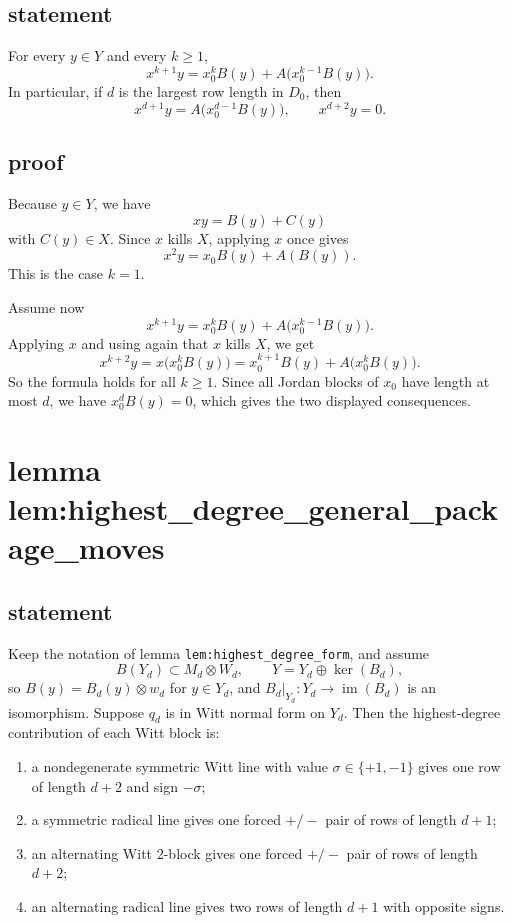 \documentclass[
]{article}
\providecommand{\tightlist}{%
  \setlength{\itemsep}{0pt}\setlength{\parskip}{0pt}}
\begin{document}
\subsection{statement}\label{statement-13}

For every \(y\in Y\) and every \(k\ge 1\), \[
x^{k+1}y=x_0^kB(y)+A\!\bigl(x_0^{k-1}B(y)\bigr).
\] In particular, if \(d\) is the largest row length in \(D_0\), then \[
x^{d+1}y=A\!\bigl(x_0^{d-1}B(y)\bigr),\qquad x^{d+2}y=0.
\]

\subsection{proof}\label{proof-13}

Because \(y\in Y\), we have \[
xy=B(y)+C(y)
\] with \(C(y)\in X\). Since \(x\) kills \(X\), applying \(x\) once
gives \[
x^2y=x_0B(y)+A(B(y)).
\] This is the case \(k=1\).

Assume now \[
x^{k+1}y=x_0^kB(y)+A\!\bigl(x_0^{k-1}B(y)\bigr).
\] Applying \(x\) and using again that \(x\) kills \(X\), we get \[
x^{k+2}y
=x\!\bigl(x_0^kB(y)\bigr)
=x_0^{k+1}B(y)+A\!\bigl(x_0^kB(y)\bigr).
\] So the formula holds for all \(k\ge 1\). Since all Jordan blocks of
\(x_0\) have length at most \(d\), we have \(x_0^dB(y)=0\), which gives
the two displayed consequences.

\section{lemma
lem:highest\_degree\_general\_package\_moves}\label{lemma-lemhighest_degree_general_package_moves}

\subsection{statement}\label{statement-14}

Keep the notation of lemma \texttt{lem:highest\_degree\_form}, and
assume \[
B(Y_d)\subset M_d\otimes W_d,
\qquad
Y=Y_d\oplus \ker(B_d),
\] so \(B(y)=B_d(y)\otimes w_d\) for \(y\in Y_d\), and
\(B_d|_{Y_d}:Y_d\to \operatorname{im}(B_d)\) is an isomorphism. Suppose
\(q_d\) is in Witt normal form on \(Y_d\). Then the highest-degree
contribution of each Witt block is:

\begin{enumerate}
\def\labelenumi{\arabic{enumi}.}
\tightlist
\item
  a nondegenerate symmetric Witt line with value \(\sigma\in\{+1,-1\}\)
  gives one row of length \(d+2\) and sign \(-\sigma\);
\item
  a symmetric radical line gives one forced \(+/-\) pair of rows of
  length \(d+1\);
\item
  an alternating Witt \(2\)-block gives one forced \(+/-\) pair of rows
  of length \(d+2\);
\item
  an alternating radical line gives two rows of length \(d+1\) with
  opposite signs.
\end{enumerate}
\end{document}
